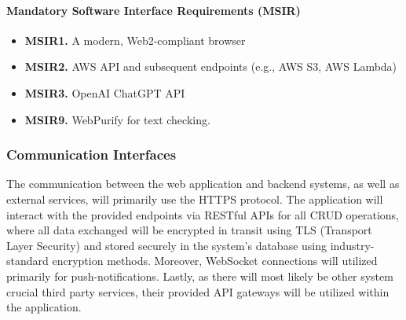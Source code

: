 \paragraph{Mandatory Software Interface Requirements (MSIR)}
\begin{itemize}
    \item \textbf{MSIR1.} A modern, Web2-compliant browser
    \item \textbf{MSIR2.} AWS API and subsequent endpoints (e.g., AWS S3, AWS Lambda)
    \item \textbf{MSIR3.} OpenAI ChatGPT API
    \item \textbf{MSIR9.} WebPurify for text checking.

\end{itemize}




\subsubsection{Communication Interfaces}
The communication between the web application and backend systems, as well as external services, will primarily use the HTTPS protocol. The application will interact with the provided endpoints via RESTful APIs for all CRUD operations, where all data exchanged will be encrypted in transit using TLS (Transport Layer Security) and stored securely in the system's database using industry-standard encryption methods. Moreover, WebSocket connections will utilized primarily for push-notifications. Lastly, as there will most likely be other system crucial third party services, their provided API gateways will be utilized within the application.
